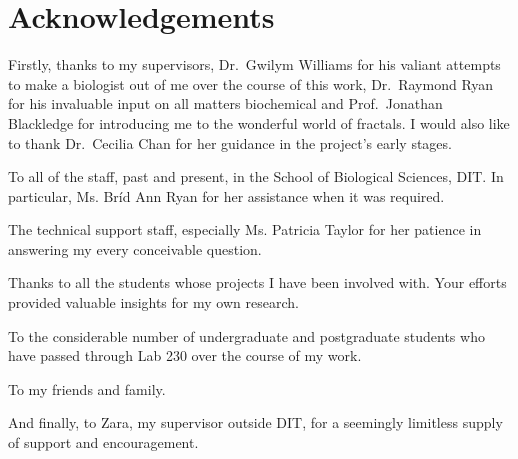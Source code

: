 {}
\section*{Acknowledgements}\thispagestyle{plain}

Firstly, thanks to my supervisors, Dr.~Gwilym Williams for his valiant attempts to make a biologist out of me over the course of this work, Dr.~Raymond Ryan for his invaluable input on all matters biochemical and Prof.~Jonathan Blackledge for introducing me to the wonderful world of fractals. I would also like to thank Dr.~Cecilia Chan for her guidance in the project's early stages.

\vspace{12pt}

\noindent To all of the staff, past and present, in the School of Biological Sciences, DIT. In particular, Ms. Br\'{i}d Ann Ryan for her assistance when it was required.

\vspace{12pt}

\noindent The technical support staff, especially Ms. Patricia Taylor for her patience in answering my every conceivable question.

\vspace{12pt}

\noindent Thanks to all the students whose projects I have been involved with. Your efforts provided valuable insights for my own research.

\vspace{12pt}

\noindent To the considerable number of undergraduate and postgraduate students who have passed through Lab 230 over the course of my work.

\vspace{12pt}

\noindent To my friends and family.

\vspace{12pt}

\noindent And finally, to Zara, my supervisor outside DIT, for a seemingly limitless supply of support and encouragement.